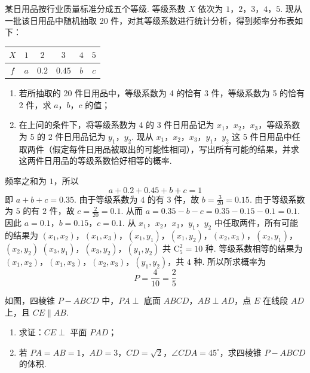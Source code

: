 \begin{problem}
某日用品按行业质量标准分成五个等级. 等级系数 \(X\) 依次为 \(1\)，\(2\)，\(3\)，\(4\)，\(5\). 现从一批该日用品中随机抽取 20 件，对其等级系数进行统计分析，得到频率分布表如下：

\begin{center}
\begin{tabular}{c|ccccc}
\(X\) & \(1\) & \(2\) & \(3\) & \(4\) & \(5\) \\
\hline
\(f\) & \(a\) & \(0.2\) & \(0.45\) & \(b\) & \(c\)
\end{tabular}
\end{center}

\begin{enumerate}
\item 若所抽取的 20 件日用品中，等级系数为 4 的恰有 3 件，等级系数为 5 的恰有 2 件，求 \(a\)，\(b\)，\(c\) 的值；
\item 在上问的条件下，将等级系数为 4 的 3 件日用品记为 \(x_{1}\)，\(x_{2}\)，\(x_{3}\)，等级系数为 5 的 2 件日用品记为 \(y_{1}\)，\(y_{2}\). 现从 \(x_{1}\)，\(x_{2}\)，\(x_{3}\)，\(y_{1}\)，\(y_{2}\) 这 5 件日用品中任取两件（假定每件日用品被取出的可能性相同），写出所有可能的结果，并求这两件日用品的等级系数恰好相等的概率.
\end{enumerate}
\end{problem}

\begin{solution}
频率之和为 \(1\)，所以
\[
a+0.2+0.45+b+c=1
\]
即 \(a+b+c=0.35\). 由于等级系数为 \(4\) 的有 \(3\) 件，故 \(b=\frac{3}{20}=0.15\). 由于等级系数为 \(5\) 的有 \(2\) 件，故 \(c=\frac{2}{20}=0.1\). 从而 \(a=0.35-b-c=0.35-0.15-0.1=0.1\). 因此 \(a=0.1\)，\(b=0.15\)，\(c=0.1\).
从 \(x_1\)，\(x_2\)，\(x_3\)，\(y_1\)，\(y_2\) 中任取两件，所有可能的结果为
\(\left(x_1,x_2\right)\)，\(\left(x_1,x_3\right)\)，\(\left(x_1,y_1\right)\)，\(\left(x_1,y_2\right)\)，\(\left(x_2,x_3\right)\)，\(\left(x_2,y_1\right)\)，\(\left(x_2,y_2\right)\)
\(\left(x_3,y_1\right)\)，\(\left(x_3,y_2\right)\)，\(\left(y_1,y_2\right)\)
共 \(\mathrm C_5^2=10\) 种. 等级系数相等的结果为 \(\left(x_1,x_2\right)\)，\(\left(x_1,x_3\right)\)，\(\left(x_2,x_3\right)\)，\(\left(y_1,y_2\right)\)，共 \(4\) 种. 所以所求概率为
\[
P=\frac{4}{10}=\frac25
\]
\end{solution}

\begin{problem}
如图，四棱锥 \(P - ABCD\) 中，\(PA \perp\) 底面 \(ABCD\)，\(AB \perp AD\)，点 \(E\) 在线段 \(AD\) 上，且 \(CE \parallel AB\).

\begin{enumerate}
\item 求证：\( CE \perp \) 平面 \(PAD\)；
\item 若 \(PA = AB = 1\)，\(AD = 3\)，\(CD = \sqrt{2}\)，\(\angle CDA = 45^{\circ}\)，求四棱锥 \(P - ABCD\) 的体积.
\end{enumerate}

\begin{center}
\end{center}
\end{problem}

